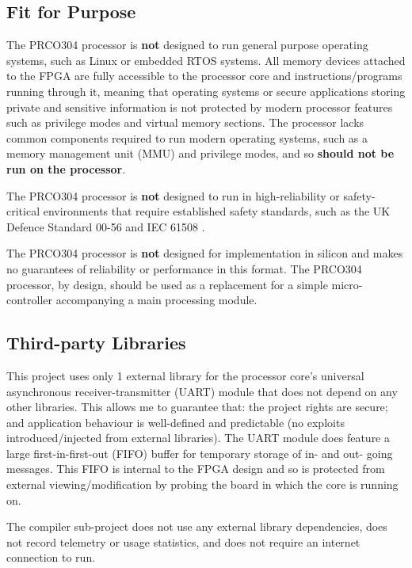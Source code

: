 \documentclass[11pt,a4paper]{report}
\newcommand{\scname}{PRCO304}
\begin{document}
\subsection{Fit for Purpose}
The \scname{} processor is \textbf{not} designed to run general purpose operating systems, such as Linux or embedded RTOS systems. All memory devices attached to the FPGA are fully accessible to the processor core and instructions/programs running through it, meaning that operating systems or secure applications storing private and sensitive information is not protected by modern processor features such as privilege modes and virtual memory sections. The processor lacks common components required to run modern operating systems, such as a memory management unit (MMU) and privilege modes, and so \textbf{should not be run on the processor}.

The \scname{} processor is \textbf{not} designed to run in high-reliability or safety-critical environments that require established safety standards, such as the UK Defence Standard 00-56 \citep{defstan_0056_2} and IEC 61508 \citep{iec61508}.

The \scname{} processor is \textbf{not} designed for implementation in silicon and makes no guarantees of reliability or performance in this format.
\newline\newline
The \scname{} processor, by design, should be used as a replacement for a simple micro-controller accompanying a main processing module.

\subsection{Third-party Libraries}
This project uses only 1 external library for the processor core's universal asynchronous receiver-transmitter (UART) module that does not depend on any other libraries. This allows me to guarantee that: the project rights are secure; and application behaviour is well-defined and predictable (no exploits introduced/injected from external libraries). The UART module does feature a large first-in-first-out (FIFO) buffer for temporary storage of in- and out- going messages. This FIFO is internal to the FPGA design and so is protected from external viewing/modification by probing the board in which the core is running on.

The compiler sub-project does not use any external library dependencies, does not record telemetry or usage statistics, and does not require an internet connection to run.
\end{document}
